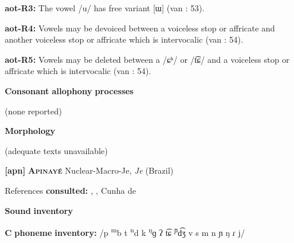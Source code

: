\begin{styleBody}
\textbf{aot-R3:} The vowel /u/ has free variant [ɯ] (van \citealt{Breugel2008}: 53).
\end{styleBody}

\begin{styleBody}
\textbf{aot-R4:} Vowels may be devoiced between a voiceless stop or affricate and another voiceless stop or affricate which is intervocalic (van \citealt{Breugel2008}: 54).
\end{styleBody}

\begin{styleBody}
\textbf{aot-R5:} Vowels may be deleted between a /ɕʰ/ or /t͡ɕ/ and a voiceless stop or affricate which is intervocalic (van \citealt{Breugel2008}: 54).
\end{styleBody}

\begin{styleBody}
\textbf{Consonant} \textbf{allophony} \textbf{processes}
\end{styleBody}

\begin{styleBody}
(none reported)
\end{styleBody}

\begin{styleBody}
\textbf{Morphology}
\end{styleBody}

\begin{styleBody}
(adequate texts unavailable)
\end{styleBody}

\begin{styleBody}
\textbf{[apn]}   \textbf{\textsc{Apinayé}}  Nuclear-Macro-Je, \textit{Je} (Brazil)
\end{styleBody}

\begin{styleBody}
References \textbf{consulted:} \citet{BurgessHam1968}, \citet{Ham2009}, Cunha de \citet{Oliveira2005}
\end{styleBody}

\begin{styleBody}
\textbf{Sound} \textbf{inventory}
\end{styleBody}

\begin{styleBody}
\textbf{C} \textbf{phoneme} \textbf{inventory:} /p \textsuperscript{m}b t \textsuperscript{n}d k \textsuperscript{ŋ}ɡ ʔ t͡ɕ \textsuperscript{ɲ}d͡ʒ v s m n ɲ ŋ ɾ j/
\end{styleBody}

